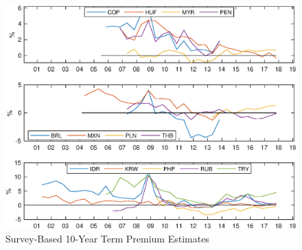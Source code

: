 	\begin{figure}[!htbp]
		\begin{centering}
			\includegraphics[width=1\textwidth,height=0.5\textheight]{../Figures/Temp/temp_tp10yrSvy}
			\par\end{centering}
		\caption{Survey-Based 10-Year Term Premium Estimates}\label{fig:temp_tp10yrSvy}
	\end{figure}